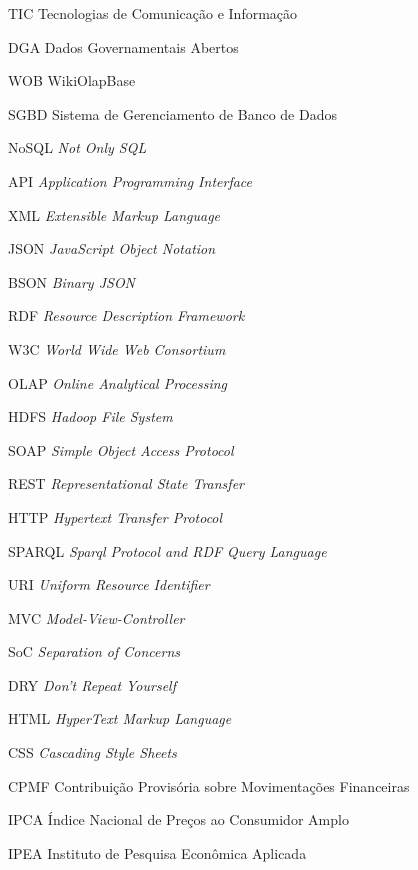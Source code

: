 
\begin{siglas}
    \item[TIC] Tecnologias de Comunicação e Informação 
    \item[DGA] Dados Governamentais Abertos
    \item[WOB] WikiOlapBase
    \item[SGBD] Sistema de Gerenciamento de Banco de Dados
    \item[NoSQL] \textit{Not Only SQL}
    \item[API] \textit{Application Programming Interface}
    \item[XML] \textit{Extensible Markup Language}
    \item[JSON] \textit{JavaScript Object Notation}
    \item[BSON] \textit{Binary JSON}
    \item[RDF] \textit{Resource Description Framework}
    \item[W3C] \textit{World Wide Web Consortium}
    \item[OLAP] \textit{Online Analytical Processing}
    \item[HDFS] \textit{Hadoop File System}
    \item[SOAP] \textit{Simple Object Access Protocol}
    \item[REST] \textit{Representational State Transfer}
    \item[HTTP] \textit{Hypertext Transfer Protocol}
    \item[SPARQL] \textit{Sparql Protocol and RDF Query Language}
    \item[URI] \textit{Uniform Resource Identifier}
    \item[MVC] \textit{Model-View-Controller}
    \item[SoC] \textit{Separation of Concerns}
    \item[DRY] \textit{Don't Repeat Yourself}
    \item[HTML] \textit{HyperText Markup Language}
    \item[CSS] \textit{Cascading Style Sheets}
    \item[CPMF] Contribuição Provisória sobre Movimentações Financeiras
    \item[IPCA] Índice Nacional de Preços ao Consumidor Amplo
    \item[IPEA] Instituto de Pesquisa Econômica Aplicada
\end{siglas}

